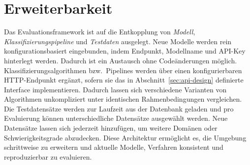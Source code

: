 \section{Erweiterbarkeit}\label{sec:erweiterbarkeit}

Das Evaluationsframework ist auf die Entkopplung von \emph{Modell}, \emph{Klassifizierungspipeline} und \emph{Testdaten} ausgelegt. Neue Modelle werden rein konfigurationsbasiert eingebunden, indem Endpunkt, Modellname und API-Key hinterlegt werden. Dadurch ist ein Austausch ohne Codeänderungen möglich. Klassifizierungsalgorithmen bzw.\ Pipelines werden über einen konfigurierbaren HTTP-Endpunkt ergänzt, sofern sie das in Abschnitt~\ref{sec:api-design} definierte Interface implementieren. Dadurch lassen sich verschiedene Varianten von Algorithmen unkompliziert unter identischen Rahmenbedingungen vergleichen. Die Testdatensätze werden zur Laufzeit aus der Datenbank geladen und pro Evaluierung können unterschiedliche Datensätze ausgewählt werden. Neue Datensätze lassen sich jederzeit hinzufügen, um weitere Domänen oder Schwierigkeitsgrade abzudecken. Diese Architektur ermöglicht es, die Umgebung schrittweise zu erweitern und aktuelle Modelle, Verfahren konsistent und reproduzierbar zu evaluieren.

